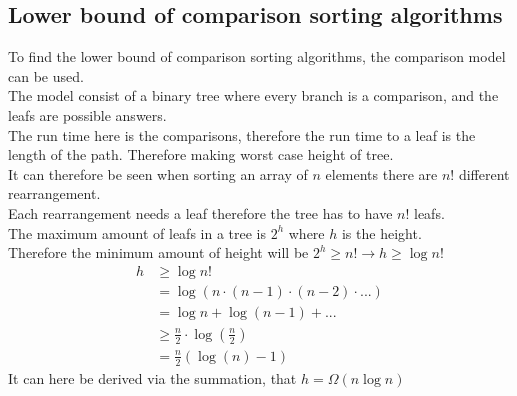 \documentclass[12pt, a4paper]{article}
\begin{document}
			\subsection{Lower bound of comparison sorting algorithms}
				To find the lower bound of comparison sorting algorithms, the comparison model can be used.\\
				The model consist of a binary tree where every branch is a comparison, and the leafs are possible answers.\\
				The run time here is the comparisons, therefore the run time to a leaf is the length of the path. Therefore making worst case height of tree.\\
				It can therefore be seen when sorting an array of $n$ elements there are $n!$  different rearrangement.\\
				Each rearrangement needs a leaf therefore the tree has to have $n!$ leafs.\\
				The maximum amount of leafs in a tree is $2^h$ where $h$ is the height.\\
				Therefore the minimum amount of height will be $2^h\geq n! \rightarrow h\geq \log n!$\\
				\begin{align*}
					h&\geq \log n!\\
					&=\log (n\cdot (n-1)\cdot (n-2)\cdot ...)\\
					&=\log n + \log(n-1) + ...\\
					&\geq \frac{n}{2}\cdot \log(\frac{n}{2})\\
					&=\frac{n}{2}(\log(n)-1)
				\end{align*}		
				It can here be derived via the summation, that $h=\Omega(n\log n)$
\end{document}
